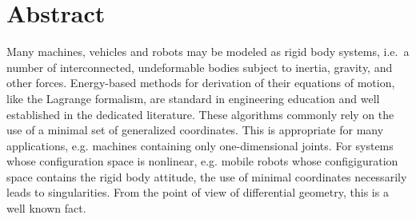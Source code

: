 \thispagestyle{plain}

% 
% 
% 
% 
% 

\section*{Abstract}
Many machines, vehicles and robots may be modeled as rigid body systems, i.e.\ a number of interconnected, undeformable bodies subject to inertia, gravity, and other forces.
Energy-based methods for derivation of their equations of motion, like the Lagrange formalism, are standard in engineering education and well established in the dedicated literature.
These algorithms commonly rely on the use of a minimal set of generalized coordinates.
This is appropriate for many applications, e.g. machines containing only one-dimensional joints.
For systems whose configuration space is nonlinear, e.g. mobile robots whose configiguration space contains the rigid body attitude, the use of minimal coordinates necessarily leads to singularities.
From the point of view of differential geometry, this is a well known fact.

